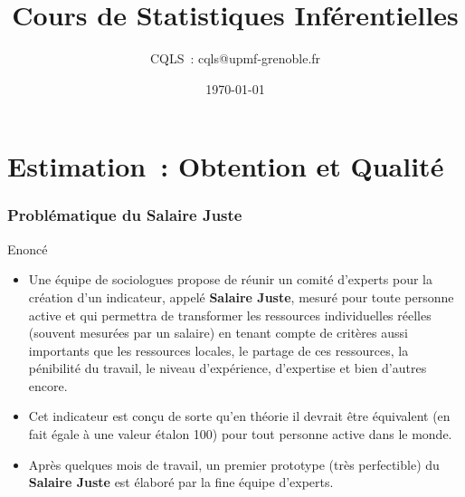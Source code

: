 \documentclass[11pt]{beamer}
\title[Problématiques Produits A et B]
{Cours de Statistiques Inférentielles}
\author{CQLS~: cqls@upmf-grenoble.fr}
\date{\today}
\begin{document}
\maketitle



\section[Estimation]{Estimation~: Obtention et Qualité}

\begin{frame}
\frametitle{Problématique du Salaire Juste}
\begin{exampleblock}{Enoncé}
\begin{itemize}
\item  Une équipe de sociologues propose de réunir un comité d'experts pour la création d'un indicateur, appelé \textbf{Salaire Juste}, mesuré pour toute personne active et qui permettra de transformer les ressources individuelles réelles (souvent mesurées par un salaire) en tenant compte de critères aussi importants que les ressources locales, le partage de ces ressources, la pénibilité du travail, le niveau d'expérience, d'expertise et bien d'autres encore.
\item Cet indicateur est conçu de sorte qu'en théorie il devrait être équivalent (en fait égale à une valeur étalon 100) pour tout personne active dans le monde.
\item Après quelques mois de travail, un premier prototype (très perfectible) du \textbf{Salaire Juste} est élaboré par la fine équipe d'experts.
\end{itemize}
\end{exampleblock}
\end{frame}
\end{document}
